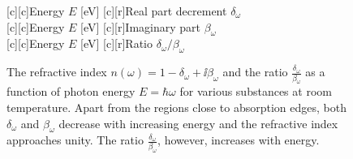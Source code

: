 \documentclass[
twoside,
openright,
titlepage,
numbers=noenddot,
headinclude,
fleqn,
a4paper,
footinclude=true,
cleardoublepage=empty,
abstractoff,
BCOR=5mm,
paper=a4,
fontsize=11pt,
british,ngerman,american,
]{scrreprt}
\begin{document}
\begin{figure}
  \centering
    { \small
      [c][c]{Energy $E$ [\si{eV}]}
      [c][r]{Real part decrement $\delta_\omega$}
    } \\ \vspace{-0.05cm}
    { \small
      [c][c]{Energy $E$ [\si{eV}]}
      [c][r]{Imaginary part $\beta_\omega$}
    } \\ \vspace{-0.05cm}
    { \small
      [c][c]{Energy $E$ [\si{eV}]}
      [c][r]{Ratio $\delta_\omega / \beta_\omega$}
    }
    \caption[The refractive index in dependence of energy.]{The
      refractive index $n(\omega)=1-\delta_\omega +\ii\beta_\omega$
      and the ratio $\frac{\delta_\omega}{\beta_\omega}$ as a function
      of photon energy $E=\hbar\omega$ for various substances at room
      temperature.  Apart from the regions close to absorption edges,
      both $\delta_\omega$ and $\beta_\omega$ decrease with increasing
      energy and the refractive index approaches unity.  The ratio
      $\frac{\delta_\omega}{\beta_\omega}$, however, increases with
      energy.}
  \label{fig:refractive-index}
\end{figure}
\end{document}
